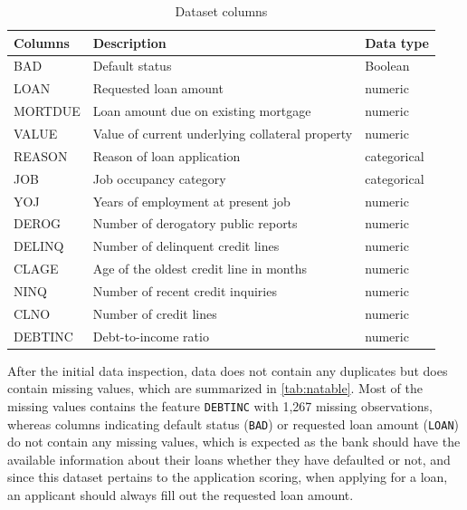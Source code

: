 \begin{table}[H]
\small
\setlength{\tabcolsep}{8pt}
\renewcommand{\arraystretch}{1.3}
\begin{center}
\caption[Dataset columns]{Dataset columns}\label{tab:dataset}
\begin{tabular}{@{} l p{8cm} l @{}}
\toprule
\textbf{Columns} & \textbf{Description} & \textbf{Data type}\\
\midrule
\hline
BAD & Default status & Boolean \\

LOAN & Requested loan amount & numeric \\

MORTDUE & Loan amount due on existing mortgage & numeric \\

VALUE & Value of current underlying collateral property & numeric \\

REASON & Reason of loan application & categorical \\
JOB & Job occupancy category & categorical \\

YOJ & Years of employment at present job & numeric \\

DEROG & Number of derogatory public reports & numeric \\

DELINQ & Number of delinquent credit lines & numeric \\

CLAGE & Age of the oldest credit line in months & numeric \\

NINQ & Number of recent credit inquiries & numeric \\

CLNO & Number of credit lines & numeric \\

DEBTINC & Debt-to-income ratio & numeric \\
\hline
\bottomrule
\end{tabular}
\end{center}
\begin{center} %
\end{center}
\end{table}

After the initial data inspection, data does not contain any duplicates but does contain missing values, which are summarized in \autoref{tab:natable}.
Most of the missing values contains the feature \texttt{DEBTINC} with 1,267 missing observations, whereas columns indicating default status (\texttt{BAD}) or requested loan amount (\texttt{LOAN}) do not contain any missing values, which is expected as the bank should have the available information about their loans whether they have defaulted or not, and since this dataset pertains to the application scoring, when applying for a loan, an applicant should always fill out the requested loan amount.

